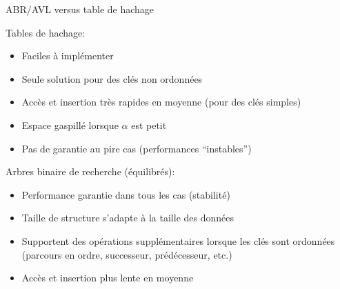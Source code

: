 \begin{frame}{ABR/AVL versus table de hachage}

Tables de hachage:
\begin{itemize}
\item Faciles à implémenter
\item Seule solution pour des clés non ordonnées
\item Accès et insertion très rapides en moyenne (pour des clés simples)
\item Espace gaspillé lorsque $\alpha$ est petit
\item Pas de garantie au pire cas (performances ``instables'')
\end{itemize}

\bigskip

Arbres binaire de recherche (équilibrés):
\begin{itemize}
\item Performance garantie dans tous les cas (stabilité)
\item Taille de structure s'adapte à la taille des données
\item Supportent des opérations supplémentaires lorsque les clés sont ordonnées (parcours en ordre, successeur, prédécesseur, etc.)
\item Accès et insertion plus lente en moyenne
\end{itemize}

\end{frame}






